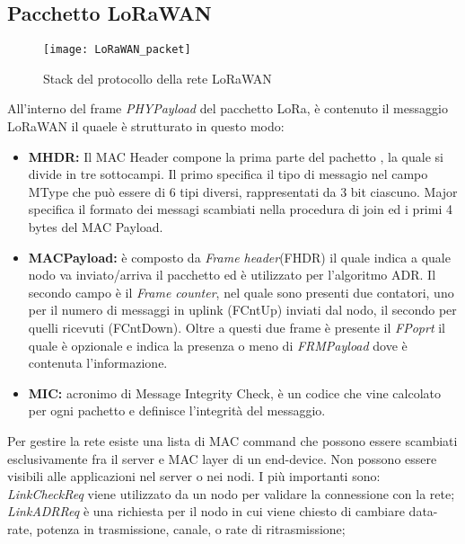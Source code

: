 \subsection{Pacchetto LoRaWAN}
\begin{figure}[h]
        \centering 
                \texttt{[image: LoRaWAN\_packet]}
        \caption{Stack del protocollo della rete LoRaWAN}
        \label{fig:stack_lora}
\end{figure}
All'interno del frame \emph{PHYPayload} del pacchetto LoRa,  è contenuto il
messaggio LoRaWAN il quaele è strutturato in questo modo: 
\begin{itemize}
        \item   \textbf{MHDR:} Il MAC Header compone la prima parte del pachetto
                , la quale si divide in tre sottocampi. Il primo specifica il
                tipo di messagio nel campo MType che può essere di 6 tipi
                diversi, rappresentati da 3 bit ciascuno. Major specifica il
                formato dei messagi scambiati nella procedura di join ed i primi
                4 bytes del MAC Payload.
        \item   \textbf{MACPayload:} è composto da \textit{Frame header}(FHDR)
                il quale indica a quale nodo va inviato/arriva il pacchetto ed è
                utilizzato per l'algoritmo ADR. Il secondo campo è il 
                \textit{Frame counter}, nel quale sono presenti due contatori,
                uno per il numero di messaggi in uplink (FCntUp) inviati dal nodo,
                il secondo per quelli ricevuti (FCntDown). Oltre a questi due frame è
                presente il \textit{FPoprt} il quale è opzionale e indica la
                presenza o meno di \textit{FRMPayload} dove è contenuta
                l'informazione.
        \item   \textbf{MIC:} acronimo di Message Integrity Check, è un codice
                che vine calcolato per ogni pachetto e definisce l'integrità del
                messaggio.
\end{itemize}

Per gestire la rete esiste una lista di MAC command che possono essere scambiati
esclusivamente fra il server e MAC layer di un end-device. Non possono essere
visibili alle applicazioni nel server o nei nodi. I più importanti sono:
\textit{LinkCheckReq} viene utilizzato da un nodo per validare la connessione con la
rete; \textit{LinkADRReq} è una richiesta per il nodo in cui viene chiesto di cambiare
data-rate, potenza in trasmissione, canale, o rate di ritrasmissione;

